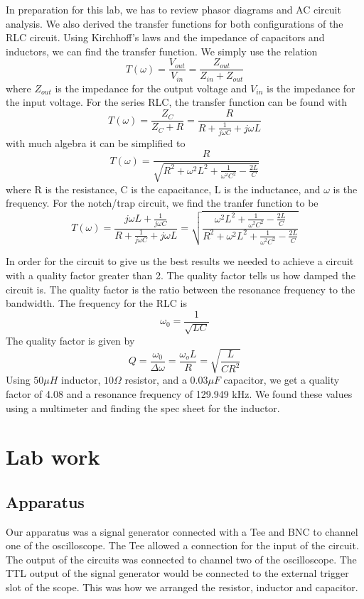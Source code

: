 \documentclass[11pt,letterpaper,onecolumn]{article}
\begin{document}
In preparation for this lab, we has to review phasor diagrams and AC circuit analysis. We also derived the transfer functions for both configurations of the RLC circuit. Using Kirchhoff's laws and the impedance of capacitors and inductors, we can find the transfer function. We simply use the relation 
$$T(\omega) = \frac{V_{out}}{V_{in}}=\frac{Z_{out}}{Z_{in}+Z_{out}}$$
where $Z_{out}$ is the impedance for the output voltage and $V_{in}$ is the impedance for the input voltage. For the series RLC, the transfer function can be found with 
$$T(\omega)=\frac{Z_C}{Z_C+R}=\frac{R}{R+\frac{1}{j\omega C}+j\omega L}$$
with much algebra it can be simplified to
$$T(\omega) = \frac{R}{\sqrt{R^2 + \omega^2L^2 + \frac{1}{\omega^2C^2}-\frac{2L}{C}}}$$
where R is the resistance, C is the capacitance, L is the inductance, and $\omega$ is the frequency. For the notch/trap circuit, we find the tranfer function to be
$$T(\omega)=\frac{j\omega L+\frac{1}{j\omega C}}{R+\frac{1}{j\omega C}+j\omega L}=\sqrt{\frac{\omega^2L^2 + \frac{1}{\omega^2C^2}-\frac{2L}{C}}{R^2 + \omega^2L^2 + \frac{1}{\omega^2C^2}-\frac{2L}{C}}}$$

In order for the circuit to give us the best results we needed to achieve a circuit with a quality factor greater than 2. The quality factor tells us how damped the circuit is. The quality factor is the ratio between the resonance frequency to the bandwidth. The frequency for the RLC is
$$\omega_0=\frac{1}{\sqrt{LC}}$$
The quality factor is given by
$$Q = \frac{\omega_0}{\Delta\omega} = \frac{\omega_oL}{R}=\sqrt{\frac{L}{CR^2}}$$
Using $50\mu H$ inductor, $10\Omega$ resistor, and a $0.03 \mu F$ capacitor, we get a quality factor of 4.08 and a resonance frequency of 129.949 kHz. We found these values using a multimeter and finding the spec sheet for the inductor. 


\section{Lab work}


\subsection{Apparatus}

Our apparatus was a signal generator connected with a Tee and BNC to channel one of the oscilloscope. The Tee allowed a connection for the input of the circuit. The output of the circuits was connected to channel two of the oscilloscope.  The TTL output of the signal generator would be connected to the external trigger slot of the scope. This was how we arranged the resistor, inductor and capacitor.
\end{document}

